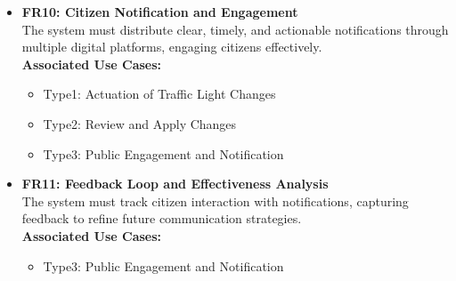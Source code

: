 \documentclass[a4paper,12pt]{article}
\begin{document}
\begin{itemize}
\item \textbf{FR10: Citizen Notification and Engagement} \\
The system must distribute clear, timely, and actionable notifications through multiple digital platforms, engaging citizens effectively. \\
\textbf{Associated Use Cases:}
\begin{itemize}
\item Type1: Actuation of Traffic Light Changes
\item Type2: Review and Apply Changes
\item Type3: Public Engagement and Notification
\end{itemize}

\item \textbf{FR11: Feedback Loop and Effectiveness Analysis} \\
The system must track citizen interaction with notifications, capturing feedback to refine future communication strategies. \\
\textbf{Associated Use Cases:}
\begin{itemize}
\item Type3: Public Engagement and Notification
\end{itemize}
\end{itemize}
\end{document}
